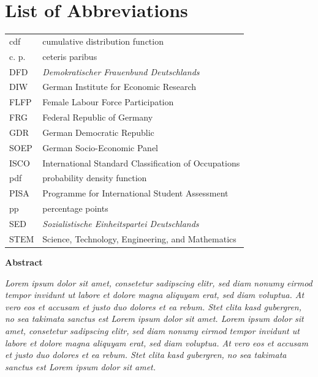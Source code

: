 \documentclass[a4paper, oneside, hyperfootnotes = false]{article}
\begin{document}
{{
{}
\section*{List of Abbreviations}
\noindent\begin{tabular}{@{}ll}
	cdf & cumulative distribution function \\
	c. p. & ceteris paribus \\
	DFD & \emph{Demokratischer Frauenbund Deutschlands} \\
    DIW & German Institute for Economic Research \\
    FLFP & Female Labour Force Participation \\
    FRG & Federal Republic of Germany \\
    GDR & German Democratic Republic \\
    SOEP & German Socio-Economic Panel \\
    ISCO & International Standard Classification of Occupations \\
    pdf & probability density function \\
    PISA & Programme for International Student Assessment \\
    pp & percentage points \\
    SED & \emph{Sozialistische Einheitspartei Deutschlands} \\
    STEM & Science, Technology, Engineering, and Mathematics
\end{tabular}

\newpage

\begin{center}
{\large\bfseries Abstract}

\vspace{5mm}

\parbox{400pt}{
    \emph{\noindent Lorem ipsum dolor sit amet, consetetur sadipscing elitr, sed diam nonumy eirmod tempor invidunt ut labore et dolore magna aliquyam erat, sed diam voluptua. At vero eos et accusam et justo duo dolores et ea rebum. Stet clita kasd gubergren, no sea takimata sanctus est Lorem ipsum dolor sit amet. Lorem ipsum dolor sit amet, consetetur sadipscing elitr, sed diam nonumy eirmod tempor invidunt ut labore et dolore magna aliquyam erat, sed diam voluptua. At vero eos et accusam et justo duo dolores et ea rebum. Stet clita kasd gubergren, no sea takimata sanctus est Lorem ipsum dolor sit amet.
    }
}

\end{center}

}}
\end{document}
